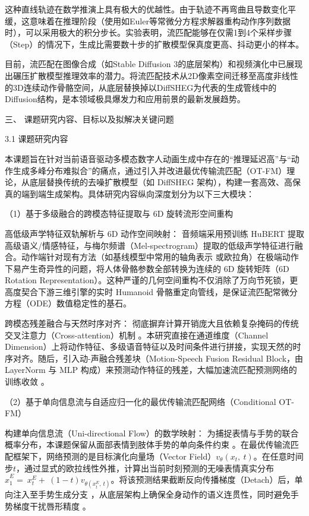 \documentclass[UTF8]{ctexart}
\begin{document}
这种直线轨迹在数学推演上具有极大的优越性。由于轨迹不再弯曲且导数变化平缓，这意味着在推理阶段（使用如Euler等常微分方程求解器重构动作序列数据时），可以采用极大的积分步长。实验表明，流匹配能够在仅需1到4个采样步骤（Step）的情况下，生成比需要数十步的扩散模型保真度更高、抖动更小的样本。

目前，流匹配在图像合成（如Stable Diffusion
3的底层架构）和视频演化中已展现出碾压扩散模型推理效率的潜力。将流匹配技术从2D像素空间迁移至高度非线性的3D连续动作骨骼空间，从底层替换掉以DiffSHEG为代表的生成管线中的Diffusion结构，是本领域极具爆发力和应用前景的最新发展趋势。

三、 课题研究内容、目标以及拟解决关键问题

3.1 课题研究内容

本课题旨在针对当前语音驱动多模态数字人动画生成中存在的``推理延迟高''与``动作生成多峰分布难拟合''的痛点，通过引入并改进最优传输流匹配（OT-FM）理论，从底层替换传统的去噪扩散模型（如
DiffSHEG
架构），构建一套高效、高保真的端到端生成架构。具体研究内容纵向深度划分为以下三大模块：

（1）基于多级融合的跨模态特征提取与 6D 旋转流形空间重构

高低级声学特征双轨解析与 6D 动作空间映射： 音频端采用预训练 HuBERT
提取高级语义/情感特征，与梅尔频谱（Mel-spectrogram）提取的低级声学特征进行融合。动作端针对现有方法（如基线模型中常用的轴角表示
或欧拉角）在极端动作下易产生奇异性的问题，将人体骨骼参数全部转换为连续的
6D 旋转矩阵（6D Rotation
Representation）。这种严谨的几何空间重构不仅消除了万向节死锁，更高度契合下游三维引擎的实时
Humanoid 骨骼重定向管线，是保证流匹配常微分方程（ODE）数值稳定性的基石。

跨模态残差融合与天然时序对齐：
彻底摒弃计算开销庞大且依赖复杂掩码的传统交叉注意力（Cross-attention）机制
。本研究直接在通道维度（Channel
Dimension）上将动作特征、多级语音特征以及时间条件进行拼接，实现天然的时序对齐。随后，引入动-声融合残差块（Motion-Speech
Fusion Residual Block，由 LayerNorm 与 MLP
构成）来预测动作特征的残差，大幅加速流匹配预测网络的训练收敛 。

（2）基于单向信息流与自适应归一化的最优传输流匹配网络（Conditional
OT-FM）

构建单向信息流（Uni-directional Flow）的数学映射：
为捕捉表情与手势的联合概率分布，本课题保留从面部表情到肢体手势的单向条件约束
。在最优传输流匹配框架下，网络预测的是目标演化向量场（Vector
Field）\(v_{\theta}\left( x_{t},\ t \right)\)。在任意时间步\(t\)，通过显式的欧拉线性外推，计算出当前时刻预测的无噪表情真实分布\({\widehat{x}}_{1}^{E} = \ x_{t}^{E} + \ (1 - t)v_{\theta\left( x_{t}^{E},\ t \right)}\)。将该预测结果截断反向传播梯度（Detach）后，单向注入至手势生成分支
，从底层架构上确保全身动作的语义连贯性，同时避免手势梯度干扰唇形精度 。
\end{document}
